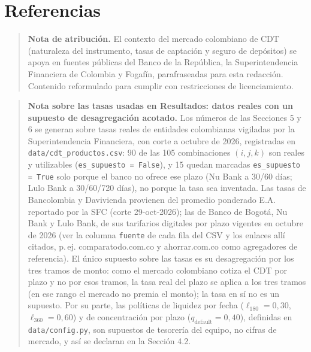 \documentclass[11pt,a4paper]{article}
\begin{document}
\section{Referencias}




\begin{quote}
\textbf{Nota de atribución.} El contexto del mercado colombiano de CDT (naturaleza del instrumento, tasas de captación y seguro de depósitos) se apoya en fuentes públicas del Banco de la República, la Superintendencia Financiera de Colombia y Fogafín, parafraseadas para esta redacción. Contenido reformulado para cumplir con restricciones de licenciamiento.
\end{quote}

\begin{quote}
\textbf{Nota sobre las tasas usadas en Resultados: datos reales con un supuesto de desagregación acotado.} Los números de las Secciones 5 y 6 se generan sobre tasas reales de entidades colombianas vigiladas por la Superintendencia Financiera, con corte a octubre de 2026, registradas en \texttt{data/cdt\_productos.csv}: 90 de las 105 combinaciones $(i, j, k)$ son reales y utilizables (\texttt{es\_supuesto = False}), y 15 quedan marcadas \texttt{es\_supuesto = True} solo porque el banco no ofrece ese plazo (Nu Bank a 30/60 días; Lulo Bank a 30/60/720 días), no porque la tasa sea inventada. Las tasas de Bancolombia y Davivienda provienen del promedio ponderado E.A. reportado por la SFC (corte 29-oct-2026); las de Banco de Bogotá, Nu Bank y Lulo Bank, de sus tarifarios digitales por plazo vigentes en octubre de 2026 (ver la columna \texttt{fuente} de cada fila del CSV y los enlaces allí citados, p.\,ej. comparatodo.com.co y ahorrar.com.co como agregadores de referencia). El único supuesto sobre las tasas es su desagregación por los tres tramos de monto: como el mercado colombiano cotiza el CDT por plazo y no por esos tramos, la tasa real del plazo se aplica a los tres tramos (en ese rango el mercado no premia el monto); la tasa en sí no es un supuesto. Por su parte, las políticas de liquidez por fecha ($\ell_{180} = 0{,}30$, $\ell_{360} = 0{,}60$) y de concentración por plazo ($q_{\text{default}} = 0{,}40$), definidas en \texttt{data/config.py}, son supuestos de tesorería del equipo, no cifras de mercado, y así se declaran en la Sección 4.2.
\end{quote}
\end{document}
